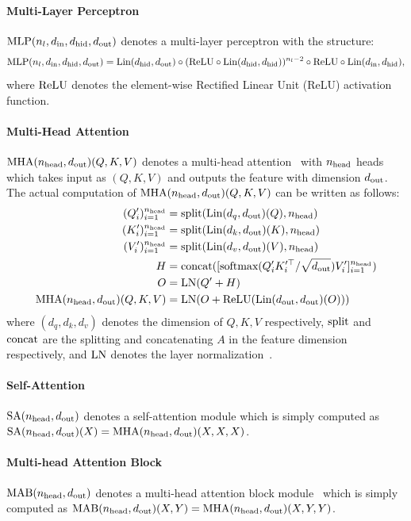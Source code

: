 \paragraph{Multi-Layer Perceptron} $\text{MLP}(n_l, d_{\text{in}}, d_{\text{hid}}, d_{\text{out}})$ denotes a multi-layer perceptron with the structure:
\begin{align*}
    \text{MLP}(n_l, d_{\text{in}}, d_{\text{hid}}, d_{\text{out}}) = \text{Lin}(d_{\text{hid}}, d_{\text{out}})\circ(\text{ReLU}\circ\text{Lin}(d_{\text{hid}},d_{\text{hid}}))^{n_l-2}\circ\text{ReLU}\circ\text{Lin}(d_{\text{in}},d_{\text{hid}}),
\end{align*}
where $\text{ReLU}$ denotes the element-wise Rectified Linear Unit (ReLU) activation function.
\paragraph{Multi-Head Attention} $\text{MHA}(n_{\text{head}}, d_{\text{out}})(Q,K,V)$ denotes a multi-head attention~\citep{vaswani2017attention} with $n_{\text{head}}$ heads which takes input as $(Q,K,V)$ and outputs the feature with dimension $d_{\text{out}}$.
The actual computation of $\text{MHA}(n_{\text{head}}, d_{\text{out}})(Q,K,V)$ can be written as follows:
\begin{align*}
    (Q_i')_{i=1}^{n_{\text{head}}} &= \text{split}(\text{Lin}(d_q,d_{\text{out}})(Q), n_{\text{head}})\\
    (K_i')_{i=1}^{n_{\text{head}}} &= \text{split}(\text{Lin}(d_k,d_{\text{out}})(K), n_{\text{head}})\\
    (V_i')_{i=1}^{n_{\text{head}}} &= \text{split}(\text{Lin}(d_v,d_{\text{out}})(V), n_{\text{head}})\\
    H &= \text{concat}([\text{softmax}(Q_i'K_i'^\top/\sqrt{d_{\text{out}}})V_i']_{i=1}^{n_{\text{head}}})\\
    O &= \text{LN}(Q'+H)\\
    \text{MHA}(n_{\text{head}},d_{\text{out}})(Q,K,V) &= \text{LN}(O+\text{ReLU}(\text{Lin}(d_{\text{out}},d_{\text{out}})(O)))
\end{align*}
where $(d_q, d_k, d_v)$ denotes the dimension of $Q,K,V$ respectively, $\text{split}$ and $\text{concat}$ are the splitting and concatenating $A$ in the feature dimension respectively, and $\text{LN}$ denotes the layer normalization~\citep{ba2016layer}.
\paragraph{Self-Attention} $\text{SA}(n_{\text{head}}, d_{\text{out}})$ denotes a self-attention module which is simply computed as $\text{SA}(n_{\text{head}}, d_{\text{out}})(X) = \text{MHA}(n_{\text{head}}, d_{\text{out}})(X,X,X)$.
\paragraph{Multi-head Attention Block} $\text{MAB}(n_{\text{head}}, d_{\text{out}})$ denotes a multi-head attention block module~\citep{lee2019set} which is simply computed as $\text{MAB}(n_{\text{head}}, d_{\text{out}})(X,Y) = \text{MHA}(n_{\text{head}}, d_{\text{out}})(X,Y,Y)$.
